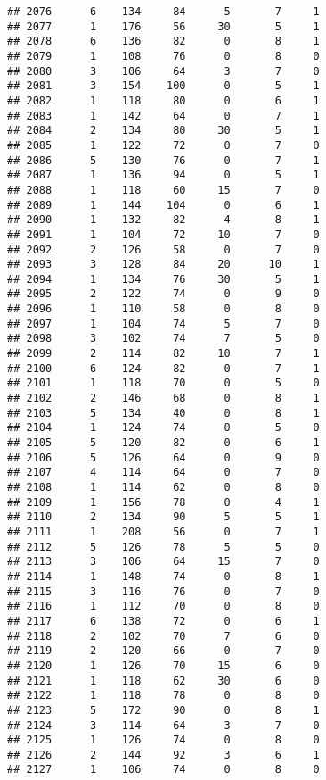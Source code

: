 \documentclass[
]{article}
\begin{document}
\begin{verbatim}
## 2076      6    134     84      5       7     1
## 2077      1    176     56     30       5     1
## 2078      6    136     82      0       8     1
## 2079      1    108     76      0       8     0
## 2080      3    106     64      3       7     0
## 2081      3    154    100      0       5     1
## 2082      1    118     80      0       6     1
## 2083      1    142     64      0       7     1
## 2084      2    134     80     30       5     1
## 2085      1    122     72      0       7     0
## 2086      5    130     76      0       7     1
## 2087      1    136     94      0       5     1
## 2088      1    118     60     15       7     0
## 2089      1    144    104      0       6     1
## 2090      1    132     82      4       8     1
## 2091      1    104     72     10       7     0
## 2092      2    126     58      0       7     0
## 2093      3    128     84     20      10     1
## 2094      1    134     76     30       5     1
## 2095      2    122     74      0       9     0
## 2096      1    110     58      0       8     0
## 2097      1    104     74      5       7     0
## 2098      3    102     74      7       5     0
## 2099      2    114     82     10       7     1
## 2100      6    124     82      0       7     1
## 2101      1    118     70      0       5     0
## 2102      2    146     68      0       8     1
## 2103      5    134     40      0       8     1
## 2104      1    124     74      0       5     0
## 2105      5    120     82      0       6     1
## 2106      5    126     64      0       9     0
## 2107      4    114     64      0       7     0
## 2108      1    114     62      0       8     0
## 2109      1    156     78      0       4     1
## 2110      2    134     90      5       5     1
## 2111      1    208     56      0       7     1
## 2112      5    126     78      5       5     0
## 2113      3    106     64     15       7     0
## 2114      1    148     74      0       8     1
## 2115      3    116     76      0       7     0
## 2116      1    112     70      0       8     0
## 2117      6    138     72      0       6     1
## 2118      2    102     70      7       6     0
## 2119      2    120     66      0       7     0
## 2120      1    126     70     15       6     0
## 2121      1    118     62     30       6     0
## 2122      1    118     78      0       8     0
## 2123      5    172     90      0       8     1
## 2124      3    114     64      3       7     0
## 2125      1    126     74      0       8     0
## 2126      2    144     92      3       6     1
## 2127      1    106     74      0       8     0

\end{verbatim}
\end{document}

